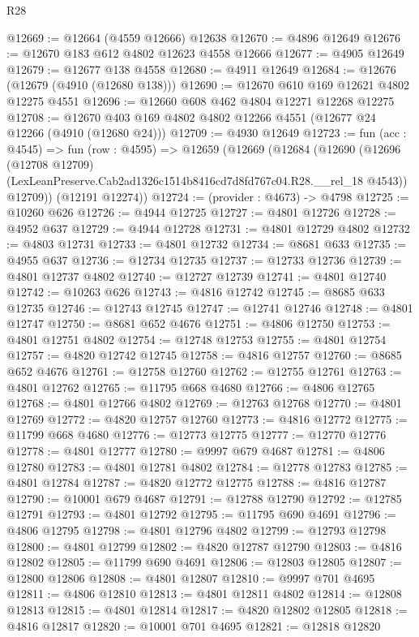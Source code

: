 \begin{lexlean}{R28}
\begin{coremodule}
@12669 := @12664 (@4559 @12666) @12638
@12670 := @4896 @12649
@12676 := @12670 @183 @612 @4802 @12623 @4558 @12666
@12677 := @4905 @12649
@12679 := @12677 @138 @4558
@12680 := @4911 @12649
@12684 := @12676 (@12679 (@4910 (@12680 @138)))
@12690 := @12670 @610 @169 @12621 @4802 @12275 @4551
@12696 := @12660 @608 @462 @4804 @12271 @12268 @12275
@12708 := @12670 @403 @169 @4802 @4802 @12266 @4551 (@12677 @24 @12266 (@4910 (@12680 @24)))
@12709 := @4930 @12649
@12723 := fun (acc : @4545) =>
  fun (row : @4595) =>
  @12659
    (@12669
      (@12684
        (@12690
          (@12696
            (@12708 @12709)
            (LexLeanPreserve.Cab2ad1326c1514b8416cd7d8fd767c04.R28.__rel_18 @4543))
          @12709))
      (@12191 @12274))
@12724 := (provider : @4673) -> @4798
@12725 := @10260 @626
@12726 := @4944 @12725
@12727 := @4801 @12726
@12728 := @4952 @637
@12729 := @4944 @12728
@12731 := @4801 @12729 @4802
@12732 := @4803 @12731
@12733 := @4801 @12732
@12734 := @8681 @633
@12735 := @4955 @637
@12736 := @12734 @12735
@12737 := @12733 @12736
@12739 := @4801 @12737 @4802
@12740 := @12727 @12739
@12741 := @4801 @12740
@12742 := @10263 @626
@12743 := @4816 @12742
@12745 := @8685 @633 @12735
@12746 := @12743 @12745
@12747 := @12741 @12746
@12748 := @4801 @12747
@12750 := @8681 @652 @4676
@12751 := @4806 @12750
@12753 := @4801 @12751 @4802
@12754 := @12748 @12753
@12755 := @4801 @12754
@12757 := @4820 @12742 @12745
@12758 := @4816 @12757
@12760 := @8685 @652 @4676
@12761 := @12758 @12760
@12762 := @12755 @12761
@12763 := @4801 @12762
@12765 := @11795 @668 @4680
@12766 := @4806 @12765
@12768 := @4801 @12766 @4802
@12769 := @12763 @12768
@12770 := @4801 @12769
@12772 := @4820 @12757 @12760
@12773 := @4816 @12772
@12775 := @11799 @668 @4680
@12776 := @12773 @12775
@12777 := @12770 @12776
@12778 := @4801 @12777
@12780 := @9997 @679 @4687
@12781 := @4806 @12780
@12783 := @4801 @12781 @4802
@12784 := @12778 @12783
@12785 := @4801 @12784
@12787 := @4820 @12772 @12775
@12788 := @4816 @12787
@12790 := @10001 @679 @4687
@12791 := @12788 @12790
@12792 := @12785 @12791
@12793 := @4801 @12792
@12795 := @11795 @690 @4691
@12796 := @4806 @12795
@12798 := @4801 @12796 @4802
@12799 := @12793 @12798
@12800 := @4801 @12799
@12802 := @4820 @12787 @12790
@12803 := @4816 @12802
@12805 := @11799 @690 @4691
@12806 := @12803 @12805
@12807 := @12800 @12806
@12808 := @4801 @12807
@12810 := @9997 @701 @4695
@12811 := @4806 @12810
@12813 := @4801 @12811 @4802
@12814 := @12808 @12813
@12815 := @4801 @12814
@12817 := @4820 @12802 @12805
@12818 := @4816 @12817
@12820 := @10001 @701 @4695
@12821 := @12818 @12820

\end{coremodule}
\end{lexlean}

